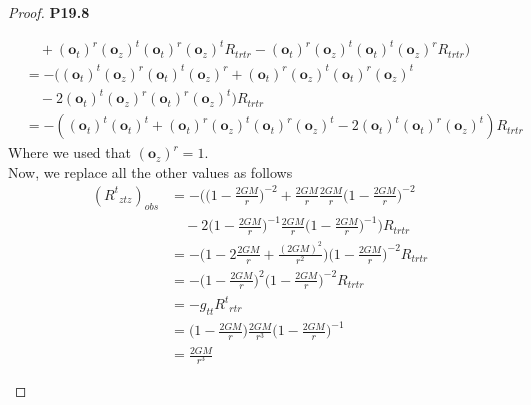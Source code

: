 \documentclass[11pt]{article}
\theoremstyle{definition}
\begin{document}
\begin{proof}{\textbf{P19.8}}
\begin{itemize}
\begin{align*}
    &\quad
    + (\bm{o}_t)^r (\bm{o}_z)^t (\bm{o}_t)^r (\bm{o}_z)^t R_{trtr}
    - (\bm{o}_t)^r (\bm{o}_z)^t (\bm{o}_t)^t (\bm{o}_z)^r R_{trtr}
    )\\[7pt]
    &= -(
    (\bm{o}_t)^t (\bm{o}_z)^r (\bm{o}_t)^t (\bm{o}_z)^r
    + (\bm{o}_t)^r (\bm{o}_z)^t (\bm{o}_t)^r (\bm{o}_z)^t\\
    &\quad- 2(\bm{o}_t)^t (\bm{o}_z)^r (\bm{o}_t)^r (\bm{o}_z)^t
    ) R_{trtr}\\[7pt]
    &= -(
    (\bm{o}_t)^t (\bm{o}_t)^t
    + (\bm{o}_t)^r (\bm{o}_z)^t (\bm{o}_t)^r (\bm{o}_z)^t
    - 2(\bm{o}_t)^t (\bm{o}_t)^r (\bm{o}_z)^t
    ) R_{trtr}
\end{align*}
Where we used that $(\bm{o}_z)^r = 1$.\\
Now, we replace all the other values as follows
\begin{align*}
    ({R^t}_{ztz})_{obs}
    &= -\bigg(\bigg(1 -\frac{2GM}{r}\bigg)^{-2} 
    + \frac{2GM}{r}\frac{2GM}{r}\bigg(1 -\frac{2GM}{r}\bigg)^{-2}\\
    &\quad- 2\bigg(1 -\frac{2GM}{r}\bigg)^{-1}\frac{2GM}{r}
    \bigg(1 -\frac{2GM}{r}\bigg)^{-1}\bigg) R_{trtr}\\[7pt]
    &= -\bigg(
    1 - 2\frac{2GM}{r} + \frac{(2GM)^2}{r^2}
    \bigg)\bigg(1 -\frac{2GM}{r}\bigg)^{-2} R_{trtr}\\[7pt]
    &= -\bigg(1 - \frac{2GM}{r}\bigg)^2
    \bigg(1 -\frac{2GM}{r}\bigg)^{-2} R_{trtr}\\[7pt]
    &= - g_{tt} {R^t}_{rtr}\\[7pt]
    &= \bigg(1 - \frac{2GM}{r}\bigg)
    \frac{2GM}{r^3}\bigg(1 - \frac{2GM}{r}\bigg)^{-1}\\
    &= \frac{2GM}{r^3}
\end{align*}
\end{itemize}
\end{proof}
\end{document}
